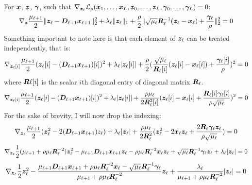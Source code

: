 For $\bm{x}$, $\bm{z}$, $\bm{\gamma}$, such that $\nabla_{\bm{z}_{\ell}} \mathcal{L}_{\rho}(\bm{x}_1,\hdots,\bm{x}_L,\bm{z}_0,\hdots,\bm{z}_L,\bm{\gamma}_0,\hdots,\bm{\gamma}_L) = 0$:
%
\begin{equation}
\nabla_{\bm{z}} \frac{\mu_{\ell + 1}}{2}\|\bm{z}_{\ell} - \bm{D}_{\ell + 1}\bm{x}_{\ell + 1}\|_2^2 + \lambda_{\ell}\|\bm{z}_{\ell}\|_1 + \frac{\rho}{2} \|\sqrt{\mu_{\ell}}\bm{R}_{\ell}^{-1}(\bm{z}_{\ell} - \bm{x}_{\ell}) + \frac{\bm{\gamma}_{\ell}}{\rho}\|_2^2 = 0
\end{equation}
%
Something important to note here is that each element of $\bm{z}_{\ell}$ can be treated independently, that is:
%
\begin{equation}
\nabla_{\bm{z}_{\ell}[i]} \frac{\mu_{\ell + 1}}{2}(\bm{z}_{\ell}[i] - (\bm{D}_{\ell + 1}\bm{x}_{\ell + 1})[i])^2 + \lambda_{\ell}|\bm{z}_{\ell}[i]| + \frac{\rho}{2} (\frac{\sqrt{\mu_{\ell}}}{\bm{R}_{\ell}[i]}(\bm{z}_{\ell}[i] - \bm{x}_{\ell}[i]) + \frac{\bm{\gamma}_{\ell}[i]}{\rho})^2 = 0
\end{equation}
%
where $\bm{R}{\ell}[i]$ is the scalar $i$th diagonal entry of diagonal matrix $\bm{R}_{\ell}$.
%
\begin{equation}
\nabla_{\bm{z}_{\ell}[i]} \frac{\mu_{\ell + 1}}{2}(\bm{z}_{\ell}[i] - (\bm{D}_{\ell + 1}\bm{x}_{\ell + 1})[i])^2 + \lambda_{\ell}|\bm{z}_{\ell}[i]| + \frac{\rho\mu_{\ell}}{2\bm{R}_{\ell}^2[i]} (\bm{z}_{\ell}[i] - \bm{x}_{\ell}[i] + \frac{\bm{R}_{\ell}[i]\bm{\gamma}_{\ell}[i]}{\rho\sqrt{\mu_{\ell}}})^2 = 0
\end{equation}
%
For the sake of brevity, I will now drop the indexing:
%
\begin{equation}
\nabla_{\bm{z}_{\ell}} \frac{\mu_{\ell + 1}}{2}(\bm{z}_{\ell}^2 - 2(\bm{D}_{\ell + 1}\bm{x}_{\ell + 1})z_{\ell}) + \lambda_{\ell}|\bm{z}_{\ell}| + \frac{\rho\mu_{\ell}}{2\bm{R}_{\ell}^2} (\bm{z}_{\ell}^2 - 2\bm{x}_{\ell}\bm{z}_{\ell} + \frac{2\bm{R}_{\ell}\bm{\gamma}_{\ell}\bm{z}_{\ell}}{\rho\sqrt{\mu_{\ell}}}) = 0
\end{equation}
%
\begin{equation}
\nabla_{\bm{z}_{\ell}} \frac{1}{2}(\mu_{\ell + 1} + \rho\mu_{\ell}\bm{R}_{\ell}^{-2})\bm{z}_{\ell}^2 - \mu_{\ell + 1}\bm{D}_{\ell + 1}\bm{x}_{\ell + 1}\bm{z}_{\ell} - \rho\mu_{\ell}\bm{R}_{\ell}^{-2}\bm{x}_{\ell}\bm{z}_{\ell} + \sqrt{\mu_{\ell}}\bm{R}_{\ell}^{-1}\bm{\gamma}_{\ell}\bm{z}_{\ell} + \lambda_{\ell}|\bm{z}_{\ell}| = 0
\end{equation}
%
\begin{equation}
\nabla_{\bm{z}_{\ell}} \frac{1}{2}\bm{z}_{\ell}^2 - \frac{\mu_{\ell + 1}\bm{D}_{\ell + 1}\bm{x}_{\ell + 1} + \rho\mu_{\ell}\bm{R}_{\ell}^{-2}\bm{x}_{\ell} - \sqrt{\mu_{\ell}}\bm{R}_{\ell}^{-1}\bm{\gamma}_{\ell}}{\mu_{\ell + 1} + \rho\mu_{\ell}\bm{R}_{\ell}^{-2}}\bm{z}_{\ell} + \frac{\lambda_{\ell}}{\mu_{\ell + 1} + \rho\mu_{\ell}\bm{R}_{\ell}^{-2}}|\bm{z}_{\ell}| = 0
\end{equation}
